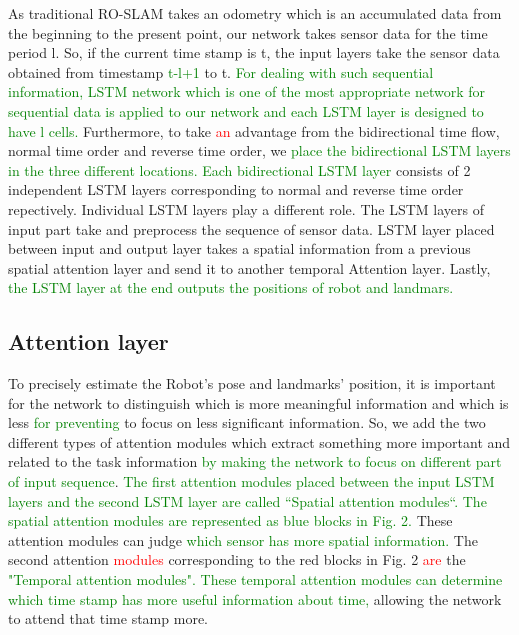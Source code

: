\documentclass[letterpaper, 10 pt, conference]{ieeeconf}  %
\begin{document}
As traditional RO-SLAM \cite{blanco2008pure,blanco2008efficient} takes an odometry which is an accumulated data from the beginning to the present point, our network takes sensor data for the time period l. So, if the current time stamp is t, the input layers take the sensor data obtained from timestamp \textcolor{green}{t-l+1} to t. \textcolor{green}{For dealing with such sequential information, LSTM network which is one of the most appropriate network for sequential data is applied to our network and each LSTM layer is designed to have l cells.} Furthermore, to take \textcolor{red}{an} advantage from the bidirectional time flow, normal time order and reverse time order, we \textcolor{green}{place the bidirectional LSTM layers in the three different locations. Each bidirectional LSTM layer} consists of 2 independent LSTM layers corresponding to normal and reverse time order repectively. Individual LSTM layers play a different role. The LSTM layers of input part take and preprocess the sequence of sensor data. LSTM layer placed between input and output layer takes a spatial information from a previous spatial attention layer and send it to another temporal Attention layer. Lastly, \textcolor{green}{the LSTM layer at the end outputs the positions of robot and landmars.}

\subsection{Attention layer}

To precisely estimate the Robot’s pose and landmarks’ position, it is important for the network to distinguish which is more meaningful information and which is less \textcolor{green}{for preventing} to focus on less significant information. So, we add the two different types of attention modules \cite{luong2015effective} which extract something more important and related to the task information \textcolor{green}{by making the network to focus on different part of input sequence}. \textcolor{green}{The first attention modules placed between the input LSTM layers and the second LSTM layer are called “Spatial attention modules“. The spatial attention modules are represented as blue blocks in Fig. 2.} These attention modules can judge \textcolor{green}{which sensor has more spatial information.} The second attention \textcolor{red}{modules} corresponding to the red blocks in Fig. 2 \textcolor{red}{are} the \textcolor{green}{"Temporal attention modules". These temporal attention modules can determine which time stamp has more useful information about time,} allowing the network to attend that time stamp more.  
\end{document}
